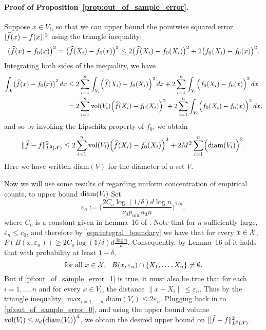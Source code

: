 \paragraph{Proof of Proposition~\ref{prop:out_of_sample_error}.}
Suppose $x \in V_i$, so that we can upper bound the pointwise squared error $|\widehat{f}(x) - f(x)|^2$ using the triangle inequality:
\begin{equation*}
\bigl(\widehat{f}(x) - f_0(x)\bigr)^2 = \bigl(\widehat{f}(X_i) - f_0(x)\bigr)^2 \leq 2\bigl(\widehat{f}(X_i) - f_0(X_i)\bigr)^2 + 2\bigl(f_0(X_i) - f_0(x)\bigr)^2.
\end{equation*}
Integrating both sides of the inequality, we have
\begin{align*}
\int_{\mathcal{X}} \bigl(\widehat{f}(x) - f_0(x)\bigr)^2 \,dx & \leq 2  \sum_{i = 1}^{n} \int_{V_i} \Bigl(\widehat{f}(X_i) - f_0(X_i)\Bigr)^2 \,dx + 2 \sum_{i = 1}^{n} \int_{V_i} \Bigl(f_0(X_i) - f_0(x)\Bigr)^2 \,dx \\
& = 2 \sum_{i = 1}^{n} \text{vol}(V_i) \Bigl(\widehat{f}(X_i) - f_0(X_i)\Bigr)^2 + 2 \sum_{i = 1}^{n} \int_{V_i} \Bigl(f_0(X_i) - f_0(x)\Bigr)^2 \,dx,
\end{align*}
and so by invoking the Lipschitz property of $f_0$, we obtain
\begin{equation}
\label{pf:out_of_sample_error_0}
\|\widehat{f} - f\|_{L^2(\mathcal{X})}^2 \leq 2 \sum_{i = 1}^{n} \text{vol}(V_i) \Bigl(\widehat{f}(X_i) - f_0(X_i)\Bigr)^2 + 2 M^2 \sum_{i = 1}^{n} \Bigl(\mathrm{diam}(V_i)\Bigr)^2.
\end{equation}
Here we have written $\mathrm{diam}(V)$ for the diameter of a set $V$. 

Now we will use some results of \citet{chaudhuri2010} regarding uniform concentration of empirical counts, to upper bound $\mathrm{diam}(V_i)$ Set
\begin{equation*}
\varepsilon_n := \biggl(\frac{2C_{o}\log(1/\delta)d\log n}{\nu_dp_{\min}a_3n}\biggr)^{1/d},
\end{equation*}
where $C_{o}$ is a constant given in Lemma~16 of \citet{chaudhuri2010}. Note that for $n$ sufficiently large, $\varepsilon_n \leq c_0$, and therefore by \eqref{eqn:integral_boundary} we have that for every $x \in \mathcal{X}$, $P(B(x,\varepsilon_n)) \geq 2C_{o}\log(1/\delta)d\frac{\log n}{n}$. Consequently, by Lemma~16 of \citet{chaudhuri2010} it holds that with probability at least $1 - \delta$,
\begin{equation}
\label{pf:out_of_sample_error_1}
\textrm{for all $x \in \mathcal{X}$},~~ B(x,\varepsilon_n) \cap \{X_1,\ldots,X_n\} \neq \emptyset.
\end{equation}
But if \eqref{pf:out_of_sample_error_1} is true, it must also be true that for each $i = 1,\ldots,n$ and for every $x \in V_i$, the distance $\|x - X_i\| \leq \varepsilon_n$. Thus by the triangle inequality, $\max_{i = 1,\ldots,n} \mathrm{diam}(V_i) \leq 2\varepsilon_n$. Plugging back in to \eqref{pf:out_of_sample_error_0}, and using the upper bound volume $\text{vol}(V_i) \leq \nu_d \bigl(\mathrm{diam}(V_i)\bigr)^d$, we obtain the desired upper bound on $\|\widehat{f} - f\|_{L^2(\mathcal{X})}^2$.

